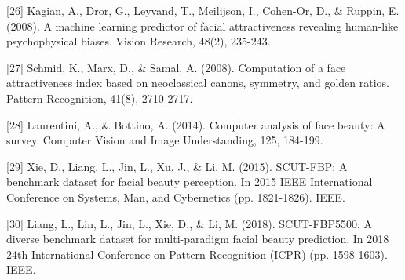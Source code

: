 [26] Kagian, A., Dror, G., Leyvand, T., Meilijson, I., Cohen-Or, D., & Ruppin, E. (2008). A machine learning predictor of facial attractiveness revealing human-like psychophysical biases. Vision Research, 48(2), 235-243.

[27] Schmid, K., Marx, D., & Samal, A. (2008). Computation of a face attractiveness index based on neoclassical canons, symmetry, and golden ratios. Pattern Recognition, 41(8), 2710-2717.

[28] Laurentini, A., & Bottino, A. (2014). Computer analysis of face beauty: A survey. Computer Vision and Image Understanding, 125, 184-199.

[29] Xie, D., Liang, L., Jin, L., Xu, J., & Li, M. (2015). SCUT-FBP: A benchmark dataset for facial beauty perception. In 2015 IEEE International Conference on Systems, Man, and Cybernetics (pp. 1821-1826). IEEE.

[30] Liang, L., Lin, L., Jin, L., Xie, D., & Li, M. (2018). SCUT-FBP5500: A diverse benchmark dataset for multi-paradigm facial beauty prediction. In 2018 24th International Conference on Pattern Recognition (ICPR) (pp. 1598-1603). IEEE.
